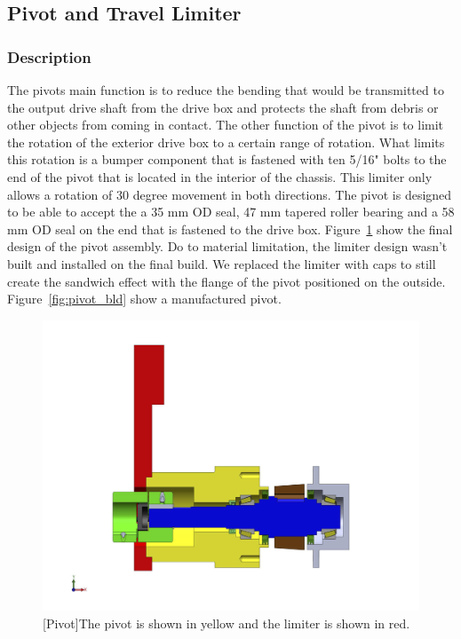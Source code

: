 \subsection{Pivot and Travel Limiter}

\subsubsection{Description}

The pivots main function is to reduce the bending that would be transmitted to the output drive shaft from the drive box and protects the shaft from debris or other objects from coming in contact. The other function of the pivot is to limit the rotation of the exterior drive box to a certain range of rotation. What limits this rotation is a bumper component that is fastened with ten 5/16" bolts to the end of the pivot that is located in the interior of the chassis. This limiter only allows a rotation of 30 degree movement in both directions. The pivot is designed to be able to accept the a 35 mm OD seal,  47 mm tapered roller bearing and a 58 mm OD seal on the end that is fastened to the drive box. Figure~\ref{fig:pivot_assembly_drw} show the final design of the pivot assembly. Do to material limitation, the limiter design wasn't built and installed on the final build. We replaced the limiter with caps to still create the sandwich effect with the flange of the pivot positioned on the outside. Figure~\ref{fig:pivot_bld} show a manufactured pivot.

\begin{figure}[htbp]
\centering
\includegraphics[height=0.3\textheight]{./images/pivot_assembly_drw}
[Pivot]{The pivot is shown in yellow and the limiter is shown in red.}
\label{fig:pivot_assembly_drw}
\end{figure}

